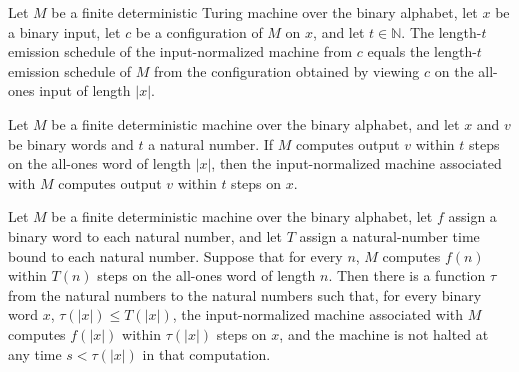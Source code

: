\begin{lemma}
\label{Complexity.b2_unary_mask}
\leanok
{}
Let $M$ be a finite deterministic Turing machine over the binary alphabet, let $x$ be a
binary input, let $c$ be a configuration of $M$ on $x$, and let $t\in\mathbb{N}$. The
length-$t$ emission schedule of the input-normalized machine from $c$ equals the
length-$t$ emission schedule of $M$ from the configuration obtained by viewing $c$ on
the all-ones input of length $|x|$.
\end{lemma}

\begin{lemma}
\label{Complexity.b2_unary_computes}
\leanok
{}
Let $M$ be a finite deterministic machine over the binary alphabet, and let $x$ and $v$
be binary words and $t$ a natural number. If $M$ computes output $v$ within $t$ steps on
the all-ones word of length $|x|$, then the input-normalized machine associated with $M$
computes output $v$ within $t$ steps on $x$.
\end{lemma}

\begin{lemma}
\label{Complexity.b2_unary_first}
\leanok
{}
Let $M$ be a finite deterministic machine over the binary alphabet, let $f$ assign a
binary word to each natural number, and let $T$ assign a natural-number time bound to
each natural number. Suppose that for every $n$, $M$ computes $f(n)$ within $T(n)$ steps
on the all-ones word of length $n$. Then there is a function $\tau$ from the natural
numbers to the natural numbers such that, for every binary word $x$, $\tau(|x|)\le
T(|x|)$, the input-normalized machine associated with $M$ computes $f(|x|)$ within
$\tau(|x|)$ steps on $x$, and the machine is not halted at any time $s<\tau(|x|)$ in
that computation.
\end{lemma}

